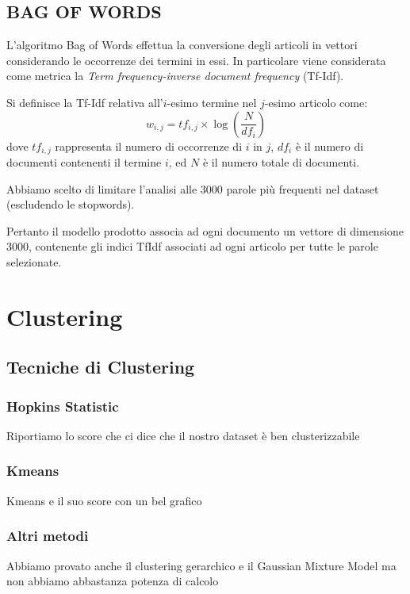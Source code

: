 \documentclass[
	12pt, %
	a4paper, %
	oneside, %
	headinclude,footinclude, %
	BCOR5mm, %
]{scrartcl}
\begin{document}
	\subsection{BAG OF WORDS}

	L'algoritmo Bag of Words\cite{bagofwords} effettua la conversione degli articoli in vettori considerando le occorrenze dei termini in essi.
	In particolare viene considerata come metrica la \textit{Term frequency-inverse document frequency} (Tf-Idf).
	
	Si definisce la Tf-Idf relativa all'$i$-esimo termine nel $j$-esimo articolo come:
	$$
	w_{i,j}=tf_{i,j}\times\log(\frac{N}{df_{i}})
	$$
	dove $tf_{i,j}$ rappresenta il numero di occorrenze di $i$ in $j$, $df_{i}$ \`{e} il numero di documenti contenenti il termine $i$, ed $N$ \`{e} il numero totale di documenti.
	
	Abbiamo scelto di limitare l'analisi alle 3000 parole pi\`{u} frequenti nel dataset (escludendo le stopwords).
	
	Pertanto il modello prodotto associa ad ogni documento un vettore di dimensione 3000, contenente gli indici TfIdf associati ad ogni articolo per tutte le parole selezionate.
	


\section{Clustering}

	\subsection{Tecniche di Clustering}

		\subsubsection{Hopkins Statistic}
			Riportiamo lo score che ci dice che il nostro dataset è ben clusterizzabile

		\subsubsection{Kmeans}
			Kmeans e il suo score con un bel grafico

		\subsubsection{Altri metodi}

			Abbiamo provato anche il clustering gerarchico e il Gaussian Mixture Model
			ma non abbiamo abbastanza potenza di calcolo
\end{document}
